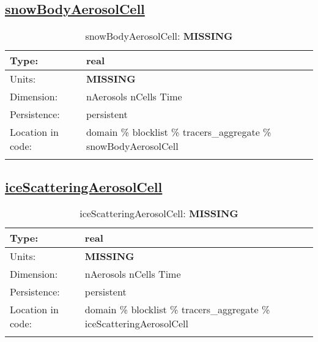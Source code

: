 \subsection[snowBodyAerosolCell]{\hyperref[sec:var_tab_tracers_aggregate]{snowBodyAerosolCell}}
\label{subsec:var_sec_tracers_aggregate_snowBodyAerosolCell}
\begin{center}
\begin{longtable}{| p{2.0in} | p{4.0in} |}
        \hline 
        Type: & real \\
        \hline 
        Units: & {\bf \color{red} MISSING} \\
        \hline 
        Dimension: & nAerosols nCells Time \\
        \hline 
        Persistence: & persistent \\
        \hline 
         Location in code: & domain \% blocklist \% tracers\_aggregate \% snowBodyAerosolCell \\
         \hline 
    \caption{snowBodyAerosolCell: {\bf \color{red} MISSING}}
\end{longtable}
\end{center}
\subsection[iceScatteringAerosolCell]{\hyperref[sec:var_tab_tracers_aggregate]{iceScatteringAerosolCell}}
\label{subsec:var_sec_tracers_aggregate_iceScatteringAerosolCell}
\begin{center}
\begin{longtable}{| p{2.0in} | p{4.0in} |}
        \hline 
        Type: & real \\
        \hline 
        Units: & {\bf \color{red} MISSING} \\
        \hline 
        Dimension: & nAerosols nCells Time \\
        \hline 
        Persistence: & persistent \\
        \hline 
         Location in code: & domain \% blocklist \% tracers\_aggregate \% iceScatteringAerosolCell \\
         \hline 
    \caption{iceScatteringAerosolCell: {\bf \color{red} MISSING}}
\end{longtable}
\end{center}
